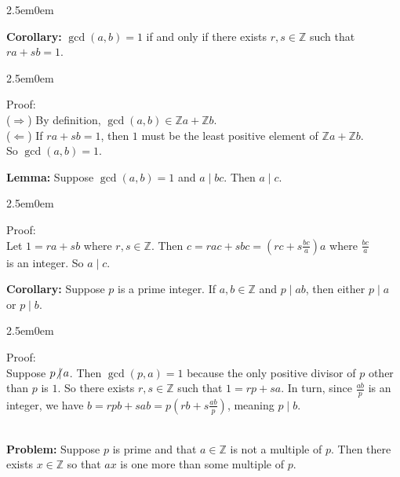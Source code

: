 \documentclass{book}
\newcommand{\hTwo}{%
\color{MidnightBlue}%
   \fontsize{13}{15}\selectfont%
}
\newcommand{\hThree}{%
   \color{PineGreen!85!Orange}
   \fontsize{12}{14}\selectfont%
}
\newcommand{\exOne}{%
   \color{Purple}%
   \fontsize{13}{15}\selectfont%
}
\newenvironment{myIndent}{%
   \begin{adjustwidth}{2.5em}{0em}%
}{%
   \end{adjustwidth}%
}
\newcommand{\blab}[1]{\textbf{#1}}
\newcommand{\divides}{\mathop{\mid}}
\newcommand{\mySepTwo}[1][.]{%
   {\noindent\color{#1}{\rule{6.5in}{0.5mm}}}\\%
}
\newcommand{\retTwo}{\hfill\bigbreak}
\begin{document}
\begin{myIndent}\hTwo
	\blab{Corollary:} $\gcd(a, b) = 1$ if and only if there exists $r, s \in \mathbb{Z}$ such that $ra + sb = 1$.
	\begin{myIndent}\hThree
		Proof:\\
		($\Longrightarrow$) By definition, $\gcd(a, b) \in \mathbb{Z}a + \mathbb{Z}b$.\\
		($\Longleftarrow$) If $ra + sb = 1$, then $1$ must be the least positive element of $\mathbb{Z}a + \mathbb{Z}b$.\\ So $\gcd(a, b) = 1$.\retTwo
	\end{myIndent}

	\blab{Lemma:} Suppose $\gcd(a, b) = 1$ and $a \divides bc$. Then $a \divides c$.
	\begin{myIndent}\hThree
		Proof:\\
		Let $1 = ra + sb$ where $r, s \in \mathbb{Z}$. Then $c = rac + sbc = (rc + s\frac{bc}{a})a$ where $\frac{bc}{a}$\\ [-2pt] is an integer. So $a \divides c$.\retTwo
	\end{myIndent}

	\blab{Corollary:} Suppose $p$ is a prime integer. If $a, b \in \mathbb{Z}$ and $p \divides ab$, then either $p \divides a$\\ or $p \divides b$.
	\begin{myIndent}\hThree
		Proof:\\
		Suppose $p {\not\divides a}$. Then $\gcd(p, a) = 1$ because the only positive divisor of $p$ other\\ than $p$ is $1$. So there exists $r, s \in \mathbb{Z}$ such that $1 = rp + sa$. In turn, since $\frac{ab}{p}$ is an\\ [-3pt] integer, we have $b = rpb + sab = p(rb +s\frac{ab}{p})$, meaning $p \divides b$.\retTwo
	\end{myIndent}
\end{myIndent}

\exOne\mySepTwo

\blab{Problem:} Suppose $p$ is prime and that $a \in \mathbb{Z}$ is not a multiple of $p$. Then there exists $x \in \mathbb{Z}$ so that $ax$ is one more than some multiple of $p$.
\end{document}
